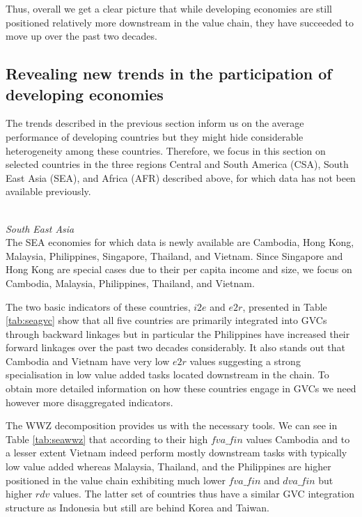 \documentclass[11pt,a4paper]{article}
\begin{document}

Thus, overall we get a clear picture that while developing economies are still positioned relatively more downstream in the value chain, they have succeeded to move up over the past two decades.



\subsection{Revealing new trends in the participation of developing economies}

The trends described in the previous section inform us on the average performance of developing countries but they might hide considerable heterogeneity among these countries. Therefore, we focus in this section on selected countries in the three regions Central and South America (CSA), South East Asia (SEA), and Africa (AFR) described above, for which data has not been available previously.\\\

\textit{South East Asia}\\
The SEA economies for which data is newly available are Cambodia, Hong Kong, Malaysia, Philippines, Singapore, Thailand, and Vietnam. Since Singapore and Hong Kong are special cases due to their per capita income and size, we focus on Cambodia, Malaysia, Philippines, Thailand, and Vietnam. 

The two basic indicators of these countries, $i2e$ and $e2r$, presented in Table \ref{tab:seagvc} show that all five countries are primarily integrated into GVCs through backward linkages but in particular the Philippines have increased their forward linkages over the past two decades considerably. It also stands out that Cambodia and Vietnam have very low $e2r$ values suggesting a strong specialisation in low value added tasks located downstream in the chain. To obtain more detailed information on how these countries engage in GVCs we need however more disaggregated indicators.

The WWZ decomposition provides us with the necessary tools. We can see in Table \ref{tab:seawwz} that according to their high $fva\_fin$ values Cambodia and to a lesser extent Vietnam indeed perform mostly downstream tasks with typically low value added whereas Malaysia, Thailand, and the Philippines are higher positioned in the value chain exhibiting much lower $fva\_fin$ and $dva\_fin$ but higher $rdv$ values. The latter set of countries thus have a similar GVC integration structure as Indonesia but still are behind Korea and Taiwan. 
\end{document}
